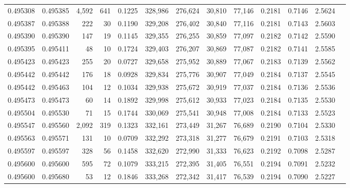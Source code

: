 \begin{tabular}{rrrrrrrrrrrrr}
0.495308 & 0.495385 & 4,592 &   641 &                                     0.1225 & 328,986 & 276,624 &  30,810 &  77,146 & 0.2181 & 0.7146 & 2.5624 \\
0.495387 & 0.495388 &   222 &    30 &                                     0.1190 & 329,208 & 276,402 &  30,840 &  77,116 & 0.2181 & 0.7143 & 2.5603 \\
0.495390 & 0.495390 &   147 &    19 &                                     0.1145 & 329,355 & 276,255 &  30,859 &  77,097 & 0.2182 & 0.7142 & 2.5590 \\
0.495395 & 0.495411 &    48 &    10 &                                     0.1724 & 329,403 & 276,207 &  30,869 &  77,087 & 0.2182 & 0.7141 & 2.5585 \\
0.495423 & 0.495423 &   255 &    20 &                                     0.0727 & 329,658 & 275,952 &  30,889 &  77,067 & 0.2183 & 0.7139 & 2.5562 \\
0.495442 & 0.495442 &   176 &    18 &                                     0.0928 & 329,834 & 275,776 &  30,907 &  77,049 & 0.2184 & 0.7137 & 2.5545 \\
0.495442 & 0.495463 &   104 &    12 &                                     0.1034 & 329,938 & 275,672 &  30,919 &  77,037 & 0.2184 & 0.7136 & 2.5536 \\
0.495473 & 0.495473 &    60 &    14 &                                     0.1892 & 329,998 & 275,612 &  30,933 &  77,023 & 0.2184 & 0.7135 & 2.5530 \\
0.495504 & 0.495530 &    71 &    15 &                                     0.1744 & 330,069 & 275,541 &  30,948 &  77,008 & 0.2184 & 0.7133 & 2.5523 \\
0.495547 & 0.495560 & 2,092 &   319 &                                     0.1323 & 332,161 & 273,449 &  31,267 &  76,689 & 0.2190 & 0.7104 & 2.5330 \\
0.495563 & 0.495571 &   131 &    10 &                                     0.0709 & 332,292 & 273,318 &  31,277 &  76,679 & 0.2191 & 0.7103 & 2.5318 \\
0.495597 & 0.495597 &   328 &    56 &                                     0.1458 & 332,620 & 272,990 &  31,333 &  76,623 & 0.2192 & 0.7098 & 2.5287 \\
0.495600 & 0.495600 &   595 &    72 &                                     0.1079 & 333,215 & 272,395 &  31,405 &  76,551 & 0.2194 & 0.7091 & 2.5232 \\
0.495600 & 0.495680 &    53 &    12 &                                     0.1846 & 333,268 & 272,342 &  31,417 &  76,539 & 0.2194 & 0.7090 & 2.5227 \\

\end{tabular}
